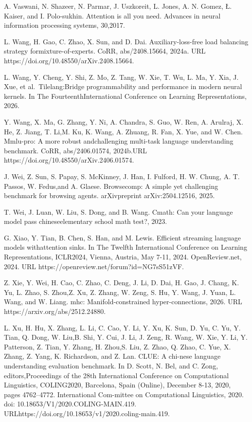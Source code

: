 \documentclass[
  10
]{article}
\begin{document}
A. Vaswani, N. Shazeer, N. Parmar, J. Uszkoreit, L. Jones, A. N. Gomez,
Ł. Kaiser, and I. Polo-sukhin. Attention is all you need. Advances in
neural information processing systems, 30,2017.

L. Wang, H. Gao, C. Zhao, X. Sun, and D. Dai. Auxiliary-loss-free load
balancing strategy formixture-of-experts. CoRR, abs/2408.15664, 2024a.
URL https://doi.org/10.48550/arXiv.2408.15664.

L. Wang, Y. Cheng, Y. Shi, Z. Mo, Z. Tang, W. Xie, T. Wu, L. Ma, Y. Xia,
J. Xue, et al.~Tilelang:Bridge programmability and performance in modern
neural kernels. In The FourteenthInternational Conference on Learning
Representations, 2026.

Y. Wang, X. Ma, G. Zhang, Y. Ni, A. Chandra, S. Guo, W. Ren, A. Arulraj,
X. He, Z. Jiang, T. Li,M. Ku, K. Wang, A. Zhuang, R. Fan, X. Yue, and W.
Chen. Mmlu-pro: A more robust andchallenging multi-task language
understanding benchmark. CoRR, abs/2406.01574, 2024b.URL
https://doi.org/10.48550/arXiv.2406.01574.

J. Wei, Z. Sun, S. Papay, S. McKinney, J. Han, I. Fulford, H. W. Chung,
A. T. Passos, W. Fedus,and A. Glaese. Browsecomp: A simple yet
challenging benchmark for browsing agents. arXivpreprint
arXiv:2504.12516, 2025.

T. Wei, J. Luan, W. Liu, S. Dong, and B. Wang. Cmath: Can your language
model pass chineseelementary school math test?, 2023.

G. Xiao, Y. Tian, B. Chen, S. Han, and M. Lewis. Efficient streaming
language models withattention sinks. In The Twelfth International
Conference on Learning Representations, ICLR2024, Vienna, Austria, May
7-11, 2024. OpenReview.net, 2024. URL
https://openreview.net/forum?id=NG7sS51zVF.

Z. Xie, Y. Wei, H. Cao, C. Zhao, C. Deng, J. Li, D. Dai, H. Gao, J.
Chang, K. Yu, L. Zhao, S. Zhou,Z. Xu, Z. Zhang, W. Zeng, S. Hu, Y. Wang,
J. Yuan, L. Wang, and W. Liang. mhc: Manifold-constrained
hyper-connections, 2026. URL https://arxiv.org/abs/2512.24880.

L. Xu, H. Hu, X. Zhang, L. Li, C. Cao, Y. Li, Y. Xu, K. Sun, D. Yu, C.
Yu, Y. Tian, Q. Dong, W. Liu,B. Shi, Y. Cui, J. Li, J. Zeng, R. Wang, W.
Xie, Y. Li, Y. Patterson, Z. Tian, Y. Zhang, H. Zhou,S. Liu, Z. Zhao, Q.
Zhao, C. Yue, X. Zhang, Z. Yang, K. Richardson, and Z. Lan. CLUE: A
chi-nese language understanding evaluation benchmark. In D. Scott, N.
Bel, and C. Zong, editors,Proceedings of the 28th International
Conference on Computational Linguistics, COLING2020, Barcelona, Spain
(Online), December 8-13, 2020, pages 4762--4772. International
Com-mittee on Computational Linguistics, 2020. doi:
10.18653/V1/2020.COLING-MAIN.419.
URLhttps://doi.org/10.18653/v1/2020.coling-main.419.
\end{document}
